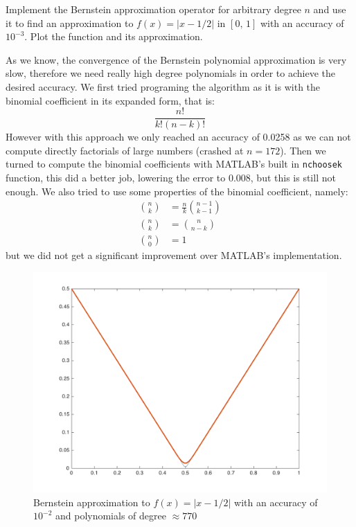 \begin{problem}
Implement the Bernstein approximation operator for arbitrary degree $n$ and use it to find an approximation to $f(x) = \lvert x - 1/2 \rvert$ in $[0,\, 1]$ with an accuracy of $10^{-3}$. Plot the function and its approximation.
\end{problem}

\begin{solution}
As we know, the convergence of the Bernstein polynomial approximation is very slow, therefore we need really high degree polynomials in order to achieve the desired accuracy. We first tried programing the algorithm as it is with the binomial coefficient in its expanded form, that is:
\begin{equation*}
\frac{n!}{k!(n-k)!}
\end{equation*}
However with this approach we only reached an accuracy of 0.0258 as we can not compute directly factorials of large numbers (crashed at $n = 172$). Then we turned to compute the binomial coefficients with MATLAB's built in \texttt{nchoosek} function, this did a better job, lowering the error to 0.008, but this is still not enough. We also tried to use some properties of the binomial coefficient, namely:
\begin{align*}
\binom{n}{k} &= \frac{n}{k}\binom{n-1}{k-1} \\
\binom{n}{k} &= \binom{n}{n-k} \\
\binom{n}{0} & = 1
\end{align*}
but we did not get a significant improvement over MATLAB's implementation.
\begin{figure}[h]
\centering 
\includegraphics[scale = 0.25]{task2hw3.png}
\caption{Bernstein approximation to $f(x) = \lvert x-1/2 \rvert$ with an accuracy of $10^{-2}$ and polynomials of degree $\approx 770$}
\label{task2hw3fig}
\end{figure}
\end{solution}